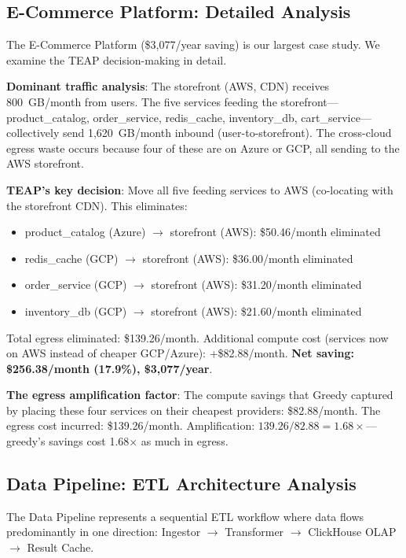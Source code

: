 \documentclass[10pt,journal]{IEEEtran}
\begin{document}
\subsection{E-Commerce Platform: Detailed Analysis}

The E-Commerce Platform (\$3,077/year saving) is our largest case study.
We examine the TEAP decision-making in detail.

\textbf{Dominant traffic analysis}: The storefront (AWS, CDN) receives 800~GB/month
from users.
The five services feeding the storefront---product\_catalog, order\_service,
redis\_cache, inventory\_db, cart\_service---collectively send 1,620~GB/month
inbound (user-to-storefront).
The cross-cloud egress waste occurs because four of these are on Azure or GCP,
all sending to the AWS storefront.

\textbf{TEAP's key decision}: Move all five feeding services to AWS (co-locating
with the storefront CDN).
This eliminates:
\begin{itemize}[leftmargin=*,noitemsep]
  \item product\_catalog (Azure) $\to$ storefront (AWS): \$50.46/month eliminated
  \item redis\_cache (GCP) $\to$ storefront (AWS): \$36.00/month eliminated
  \item order\_service (GCP) $\to$ storefront (AWS): \$31.20/month eliminated
  \item inventory\_db (GCP) $\to$ storefront (AWS): \$21.60/month eliminated
\end{itemize}
Total egress eliminated: \$139.26/month.
Additional compute cost (services now on AWS instead of cheaper GCP/Azure): +\$82.88/month.
\textbf{Net saving: \$256.38/month (17.9\%), \$3,077/year}.

\textbf{The egress amplification factor}: The compute savings that Greedy captured
by placing these four services on their cheapest providers: \$82.88/month.
The egress cost incurred: \$139.26/month.
Amplification: $139.26/82.88 = 1.68\times$---greedy's savings cost 1.68$\times$ as
much in egress.

\subsection{Data Pipeline: ETL Architecture Analysis}

The Data Pipeline represents a sequential ETL workflow where data flows predominantly
in one direction: Ingestor $\to$ Transformer $\to$ ClickHouse OLAP $\to$ Result Cache.
\end{document}
